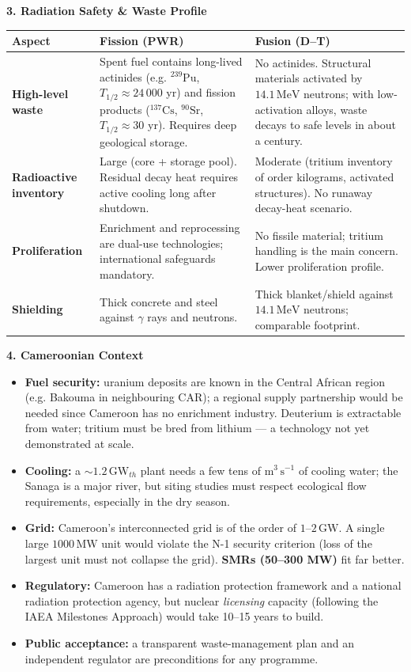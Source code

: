 \documentclass[11pt]{article}
\begin{document}
\begin{center}
{\begin{minipage}{0.92\linewidth}
\textbf{3. Radiation Safety \& Waste Profile}
\begin{center}
\begin{tabularx}{\linewidth}{|l|X|X|}\hline
\rowcolor{popblueL}
\textbf{Aspect} & \textbf{Fission (PWR)} & \textbf{Fusion (D--T)} \\ \hline
\textbf{High-level waste} & Spent fuel contains long-lived actinides (e.g. $^{239}\mathrm{Pu}$, $T_{1/2} \approx 24\,000$ yr) and fission products ($^{137}\mathrm{Cs}$, $^{90}\mathrm{Sr}$, $T_{1/2} \approx 30$ yr). Requires deep geological storage. & No actinides. Structural materials activated by $14.1\,\mathrm{MeV}$ neutrons; with low-activation alloys, waste decays to safe levels in about a century. \\ \hline
\textbf{Radioactive inventory} & Large (core + storage pool). Residual decay heat requires active cooling long after shutdown. & Moderate (tritium inventory of order kilograms, activated structures). No runaway decay-heat scenario. \\ \hline
\textbf{Proliferation} & Enrichment and reprocessing are dual-use technologies; international safeguards mandatory. & No fissile material; tritium handling is the main concern. Lower proliferation profile. \\ \hline
\textbf{Shielding} & Thick concrete and steel against $\gamma$ rays and neutrons. & Thick blanket/shield against $14.1\,\mathrm{MeV}$ neutrons; comparable footprint. \\ \hline
\end{tabularx}
\end{center}

\textbf{4. Cameroonian Context}
\begin{itemize}
    \item \textbf{Fuel security:} uranium deposits are known in the Central African region (e.g. Bakouma in neighbouring CAR); a regional supply partnership would be needed since Cameroon has no enrichment industry. Deuterium is extractable from water; tritium must be bred from lithium — a technology not yet demonstrated at scale.
    \item \textbf{Cooling:} a $\sim 1.2\,\mathrm{GW}_{th}$ plant needs a few tens of $\mathrm{m^3\,s^{-1}}$ of cooling water; the Sanaga is a major river, but siting studies must respect ecological flow requirements, especially in the dry season.
    \item \textbf{Grid:} Cameroon's interconnected grid is of the order of $1$--$2\,\mathrm{GW}$. A single large $1000\,\mathrm{MW}$ unit would violate the N-1 security criterion (loss of the largest unit must not collapse the grid). \textbf{SMRs (50--300 MW)} fit far better.
    \item \textbf{Regulatory:} Cameroon has a radiation protection framework and a national radiation protection agency, but nuclear \emph{licensing} capacity (following the IAEA Milestones Approach) would take 10--15 years to build.
    \item \textbf{Public acceptance:} a transparent waste-management plan and an independent regulator are preconditions for any programme.
\end{itemize}


\end{minipage}}
\end{center}
\end{document}
